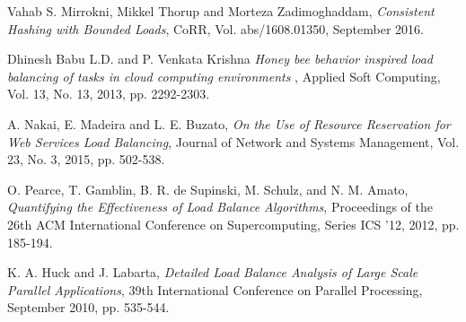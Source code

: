\begin{thebibliography}{1}
Vahab S. Mirrokni, Mikkel Thorup and Morteza Zadimoghaddam,
  \emph{Consistent Hashing with Bounded Loads},
  CoRR,
  Vol. abs/1608.01350, September 2016.

  Dhinesh Babu L.D. and P. Venkata Krishna
  \emph{Honey bee behavior inspired load balancing of tasks in cloud computing environments },
  Applied Soft Computing,
  Vol. 13, No. 13, 2013, pp. 2292-2303.

  A. Nakai, E. Madeira and L. E. Buzato,
  \emph{On the Use of Resource Reservation for Web Services Load Balancing},
  Journal of Network and Systems Management,
  Vol. 23, No. 3, 2015, pp. 502-538.

  O. Pearce, T. Gamblin, B. R. de Supinski, M. Schulz, and N. M. Amato,
  \emph{Quantifying the Effectiveness of Load Balance Algorithms},
  Proceedings of the 26th ACM International Conference on Supercomputing,
  Series ICS '12, 2012, pp. 185-194.

  K. A. Huck and J. Labarta,
  \emph{Detailed Load Balance Analysis of Large Scale Parallel Applications},
  39th International Conference on Parallel Processing,
  September 2010, pp. 535-544.

\end{thebibliography}
